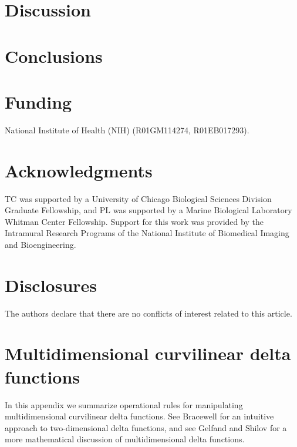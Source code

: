\documentclass[]{osa-article}
\begin{document}



\section{Discussion}

\section{Conclusions}

\section*{Funding}
National Institute of Health (NIH) (R01GM114274, R01EB017293).

\section*{Acknowledgments}
TC was supported by a University of Chicago Biological Sciences Division Graduate Fellowship, and PL was supported by a Marine Biological Laboratory Whitman Center Fellowship. Support for this work was provided by the Intramural Research Programs of the National Institute of Biomedical Imaging and Bioengineering. 

\section*{Disclosures}
The authors declare that there are no conflicts of interest related to this article.


\appendix

\section{Multidimensional curvilinear delta functions}\label{sec:delta}
In this appendix we summarize operational rules for manipulating multidimensional curvilinear delta functions. See Bracewell \cite{bracewell2004} for an intuitive approach to two-dimensional delta functions, and see Gelfand and Shilov \cite{gelfand2016} for a more mathematical discussion of multidimensional delta functions.
\end{document}
